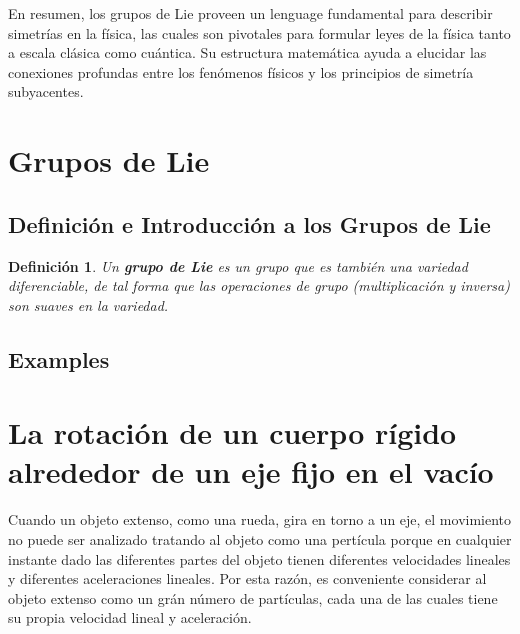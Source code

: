\documentclass{article}
\newtheorem{definition}[theorem]{Definición}
\begin{document}
En resumen, los grupos de Lie proveen un lenguage fundamental para describir simetrías en la física, las cuales son pivotales para formular leyes de la física tanto a escala clásica como cuántica. Su estructura matemática ayuda a elucidar las conexiones profundas entre los fenómenos físicos y los principios de simetría subyacentes.

\section{Grupos de Lie}

\subsection{Definición e Introducción a los Grupos de Lie}


\begin{definition}
  Un \textbf{grupo de Lie} es un grupo que es también una variedad diferenciable, de tal forma que las operaciones de grupo (multiplicación y inversa) son suaves en la variedad.
\end{definition}

\subsection{Examples}

\section{La rotación de un cuerpo rígido alrededor de un eje fijo en el vacío}




Cuando un objeto extenso, como una rueda, gira en torno a un eje, el movimiento no puede ser analizado tratando al objeto como una pertícula porque en cualquier instante dado las diferentes partes del objeto tienen diferentes velocidades lineales y diferentes aceleraciones lineales. Por esta razón, es conveniente considerar al objeto extenso como un grán número de partículas, cada una de las cuales tiene su propia velocidad lineal y aceleración.
\end{document}
